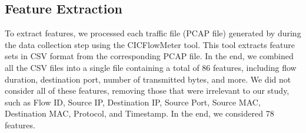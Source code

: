



\subsection{Feature Extraction}\label{sec:feature}

To extract features, we processed each traffic file (PCAP file) generated by \droidxpflow during the data collection step using the CICFlowMeter tool. This tool extracts feature sets in CSV format from the corresponding PCAP file. In the end, we combined all the CSV files into a single file containing a total of 86 features, including flow duration, destination port, number of transmitted bytes, and more. We did not consider all of these features, removing those that were irrelevant to our study, such as Flow ID, Source IP, Destination IP, Source Port, Source MAC, Destination MAC, Protocol, and Timestamp. In the end, we considered 78 features.


